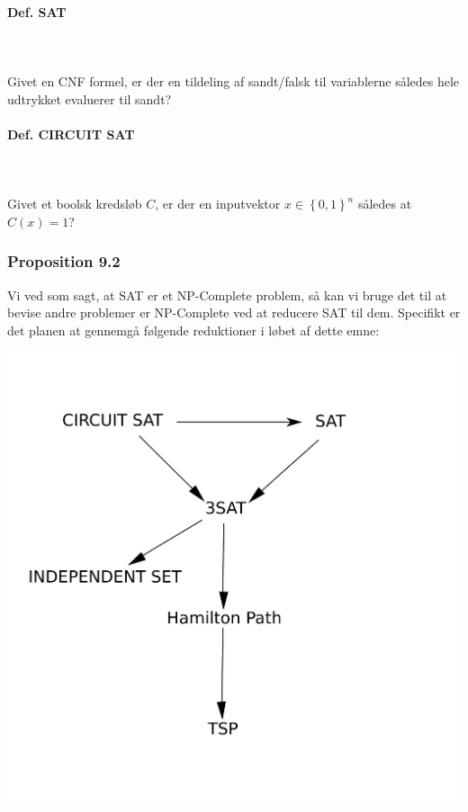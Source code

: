 \paragraph{Def. SAT}
~\\
~\\
Givet en CNF formel, er der en tildeling af sandt/falsk til variablerne således hele udtrykket evaluerer til sandt?\\

\paragraph{Def. CIRCUIT SAT}
~\\
~\\
Givet et boolsk kredsløb $C$, er der en inputvektor $x \in \left\lbrace 0,1 \right\rbrace^n$ således at $C(x) = 1$?

\subsubsection{Proposition 9.2}

Vi ved som sagt, at SAT er et NP-Complete problem, så kan vi bruge det til at bevise andre problemer er NP-Complete ved at reducere SAT til dem.
Specifikt er det planen at gennemgå følgende reduktioner i løbet af dette emne:
\begin{center}
 \includegraphics[bb=0 0 400 400,scale=0.5]{./GraphReductionTree.png}
\end{center}

